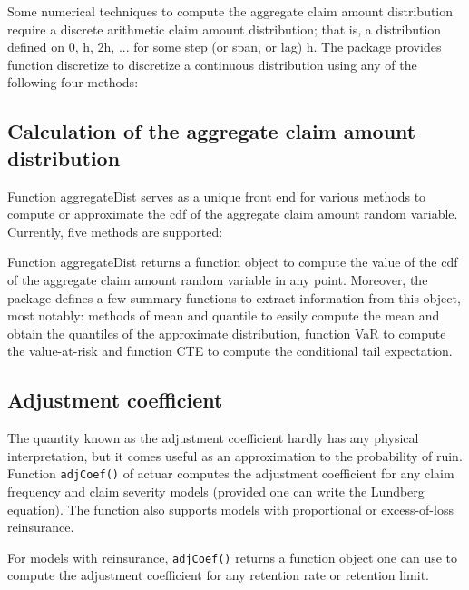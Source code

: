\documentclass[12pt]{article}
\begin{document}
Some numerical techniques to compute the aggregate claim amount distribution require a discrete arithmetic claim amount distribution; that is, a distribution defined on 0, h, 2h, ... for some step (or span, or lag) h. The package provides function discretize to discretize a continuous distribution using any of the following four methods:

\subsection{Calculation of the aggregate claim amount distribution}

Function aggregateDist serves as a unique front end for various methods to compute or approximate the cdf of the aggregate claim amount random variable. Currently, five methods are supported:

Function aggregateDist returns a function object to compute the value of the cdf of the aggregate claim amount random variable in any point. Moreover, the package defines a few summary functions to extract information from this object, most notably: methods of mean and quantile to easily compute the mean and obtain the quantiles of the approximate distribution, function VaR to compute the value-at-risk and function CTE to compute the conditional tail expectation.

\subsection{Adjustment coefficient}

The quantity known as the adjustment coefficient hardly has any physical interpretation, but it comes useful as an approximation to the probability of ruin. Function \texttt{adjCoef()} of actuar computes the adjustment coefficient for any claim frequency and claim severity models (provided one can write the Lundberg equation). The function also supports models with proportional or excess-of-loss reinsurance.

For models with reinsurance, \texttt{adjCoef()} returns a function object one can use to compute the adjustment coefficient for any retention rate or retention limit.
\end{document}
